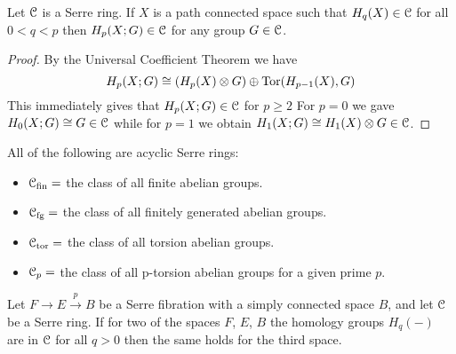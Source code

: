\begin{proposition}
\label{SERRE RING HOMOLOGY PROP}
Let ${\mathcal C}$ is a Serre ring. If $X$ is a path connected space such that 
$H_{q}(X) \in {\mathcal C}$ for all $0 < q < p$ then $H_{p}(X; G) \in {\mathcal C}$ for any group 
$G\in {\mathcal C}$. 
\end{proposition}

\begin{proof}
By the Universal Coefficient Theorem we have 
\[ 
H_{p}(X; G) \cong (H_{p}(X)\otimes G) \oplus \operatorname{Tor}(H_{p-1}(X), G)
\]
This immediately gives that $H_{p}(X; G)\in {\mathcal C}$ for $p\geq 2$
For $p=0$ we gave $H_{0}(X; G) \cong G \in {\mathcal C}$ while for 
$p=1$ we obtain $H_{1}(X; G) \cong H_{1}(X)\otimes G \in {\mathcal C}$.
\end{proof}




\begin{proposition} All of the following are acyclic Serre rings:
\ 
\begin{itemize}
\item ${\mathcal{C}_{\text{fin}}} = $ the class of all finite abelian groups.
\item ${\mathcal{C}_{\text{fg}}} = $ the class of all finitely generated abelian groups.
\item ${\mathcal{C}_{\text{tor}}} = $ the class of all torsion abelian groups.
\item ${\mathcal C}_{p} = $ the class of all p-torsion abelian groups for 
a given prime $p$.
\end{itemize}
\end{proposition}


\begin{theorem}
\label{2 OF 3 SERRE CLASS HOMOLOGY THM}
Let $F \to E \overset{p}{\to} B$ be a Serre fibration with a simply connected space 
$B$, and let ${\mathcal C}$ be a Serre ring. If for two of the spaces $F$, $E$, $B$
the homology groups $H_{q}(-)$ are in ${\mathcal C}$ for all $q>0$ then the same holds 
for the third space.
\end{theorem}

